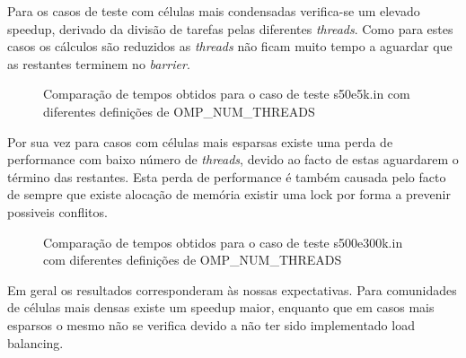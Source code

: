 \documentclass[twoside,twocolumn]{article}
\begin{document}
Para os casos de teste com células mais condensadas verifica-se um elevado speedup, derivado da divisão de tarefas pelas diferentes \textit{threads}.
Como para estes casos os cálculos são reduzidos as \textit{threads} não ficam muito tempo a aguardar que as restantes terminem no \textit{barrier}.

\begin{figure}[H]
    \centering
    \caption{Comparação de tempos obtidos para o caso de teste s50e5k.in com diferentes definições de OMP\_NUM\_THREADS}
    \label{search}
\end{figure}

Por sua vez para casos com células mais esparsas existe uma perda de performance com baixo número de \textit{threads}, devido ao facto de estas
aguardarem o término das restantes. Esta perda de performance é também causada pelo facto de sempre que existe alocação de memória existir
uma lock por forma a prevenir possiveis conflitos.

\begin{figure}[H]
    \centering
    \caption{Comparação de tempos obtidos para o caso de teste s500e300k.in com diferentes definições de OMP\_NUM\_THREADS}
    \label{search}
\end{figure}

Em geral os resultados corresponderam às nossas expectativas. Para comunidades de células mais densas existe um speedup maior, enquanto que em casos
mais esparsos o mesmo não se verifica devido a não ter sido implementado load balancing.

\end{document}
